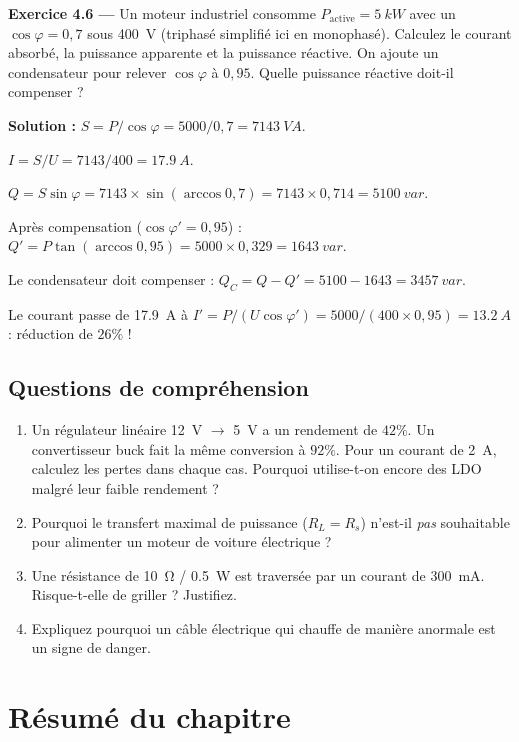 \documentclass[12pt,a4paper,twoside]{book}
\begin{document}
\textbf{Exercice 4.6 —} Un moteur industriel consomme $P_{\text{active}} = \SI{5}{kW}$ avec un $\cos\varphi = 0{,}7$ sous \SI{400}{V} (triphasé simplifié ici en monophasé). Calculez le courant absorbé, la puissance apparente et la puissance réactive. On ajoute un condensateur pour relever $\cos\varphi$ à $0{,}95$. Quelle puissance réactive doit-il compenser ?

\begin{pratique}
\textbf{Solution :} $S = P/\cos\varphi = 5000/0{,}7 = \SI{7143}{VA}$.

$I = S/U = 7143/400 = \SI{17.9}{A}$.

$Q = S\sin\varphi = 7143 \times \sin(\arccos 0{,}7) = 7143 \times 0{,}714 = \SI{5100}{var}$.

Après compensation ($\cos\varphi' = 0{,}95$) : $Q' = P\tan(\arccos 0{,}95) = 5000 \times 0{,}329 = \SI{1643}{var}$.

Le condensateur doit compenser : $Q_C = Q - Q' = 5100 - 1643 = \SI{3457}{var}$.

Le courant passe de \SI{17.9}{A} à $I' = P/(U\cos\varphi') = 5000/(400\times0{,}95) = \SI{13.2}{A}$ : réduction de $26\%$ !
\end{pratique}

\subsection*{Questions de compréhension}

\begin{enumerate}[nosep]
\item Un régulateur linéaire \SI{12}{V} $\to$ \SI{5}{V} a un rendement de $42\%$. Un convertisseur buck fait la même conversion à $92\%$. Pour un courant de \SI{2}{A}, calculez les pertes dans chaque cas. Pourquoi utilise-t-on encore des LDO malgré leur faible rendement ?
\item Pourquoi le transfert maximal de puissance ($R_L = R_s$) n'est-il \textit{pas} souhaitable pour alimenter un moteur de voiture électrique ?
\item Une résistance de \SI{10}{\ohm} / \SI{0.5}{W} est traversée par un courant de \SI{300}{mA}. Risque-t-elle de griller ? Justifiez.
\item Expliquez pourquoi un câble électrique qui chauffe de manière anormale est un signe de danger.
\end{enumerate}

\section*{Résumé du chapitre}
\end{document}
